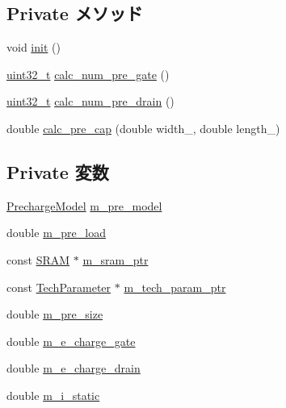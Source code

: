 \subsection*{Private メソッド}
\begin{DoxyCompactItemize}
\item 
void \hyperlink{classPrechargeUnit_a02fd73d861ef2e4aabb38c0c9ff82947}{init} ()
\item 
\hyperlink{Type_8hh_a435d1572bf3f880d55459d9805097f62}{uint32\_\-t} \hyperlink{classPrechargeUnit_aa7632b627f168ac293810ce062a2c849}{calc\_\-num\_\-pre\_\-gate} ()
\item 
\hyperlink{Type_8hh_a435d1572bf3f880d55459d9805097f62}{uint32\_\-t} \hyperlink{classPrechargeUnit_adf0eb6048a8f92a38c67dd1deb385dd0}{calc\_\-num\_\-pre\_\-drain} ()
\item 
double \hyperlink{classPrechargeUnit_a1cca7b8a2920e2de2a2e11241a35a4c4}{calc\_\-pre\_\-cap} (double width\_\-, double length\_\-)
\end{DoxyCompactItemize}
\subsection*{Private 変数}
\begin{DoxyCompactItemize}
\item 
\hyperlink{classPrechargeUnit_a6180eb16d57b141633059448fde14938}{PrechargeModel} \hyperlink{classPrechargeUnit_ad066eb2d564a668078dbdf1ac6236c5e}{m\_\-pre\_\-model}
\item 
double \hyperlink{classPrechargeUnit_a0ab919f80d0ba7b69d7bbbe332f5a6e7}{m\_\-pre\_\-load}
\item 
const \hyperlink{classSRAM}{SRAM} $\ast$ \hyperlink{classPrechargeUnit_aab5dce4213ab482c5e1909bfc96d62af}{m\_\-sram\_\-ptr}
\item 
const \hyperlink{classTechParameter}{TechParameter} $\ast$ \hyperlink{classPrechargeUnit_a11d1644aa2bfe0e16783dface6fadf13}{m\_\-tech\_\-param\_\-ptr}
\item 
double \hyperlink{classPrechargeUnit_a1f5999661eb253d9493b6020b6525802}{m\_\-pre\_\-size}
\item 
double \hyperlink{classPrechargeUnit_a7594d6475a22c66df7305a68b6227309}{m\_\-e\_\-charge\_\-gate}
\item 
double \hyperlink{classPrechargeUnit_a4ce26f0ae278a8df4466fe5e41e7002f}{m\_\-e\_\-charge\_\-drain}
\item 
double \hyperlink{classPrechargeUnit_a16f0c9e5942378eab4d83da3c61aba7f}{m\_\-i\_\-static}
\end{DoxyCompactItemize}


